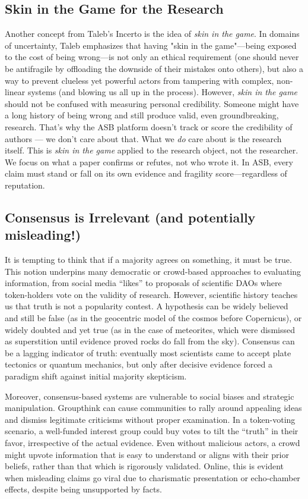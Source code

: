 \documentclass{article}
\begin{document}
\subsection{Skin in the Game for the Research}
Another concept from Taleb's Incerto is the idea of \emph{skin in the game}\cite{Taleb2018}. In domains of uncertainty, Taleb emphasizes that having "skin in the game"—being exposed to the cost of being wrong—is not only an ethical requirement (one should never be antifragile by offloading the downside of their mistakes onto others), but also a way to prevent clueless yet powerful actors from tampering with complex, non-linear systems (and blowing us all up in the process).
However, \emph{skin in the game} should not be confused with measuring personal credibility. Someone might have a long history of being wrong and still produce valid, even groundbreaking, research. That’s why the ASB platform doesn't track or score the credibility of authors — we don't care about that. What we \emph{do} care about is the research itself. 
This is \emph{skin in the game} applied to the research object, not the researcher. We focus on what a paper confirms or refutes, not who wrote it. In ASB, every claim must stand or fall on its own evidence and fragility score—regardless of reputation.

\subsection{Consensus is Irrelevant (and potentially misleading!)}
It is tempting to think that if a majority agrees on something, it must be true. This notion underpins many democratic or crowd-based approaches to evaluating information, from social media ``likes'' to proposals of scientific DAOs where token-holders vote on the validity of research. However, scientific history teaches us that truth is not a popularity contest. A hypothesis can be widely believed and still be false (as in the geocentric model of the cosmos before Copernicus), or widely doubted and yet true (as in the case of meteorites, which were dismissed as superstition until evidence proved rocks do fall from the sky). Consensus can be a lagging indicator of truth: eventually most scientists came to accept plate tectonics or quantum mechanics, but only after decisive evidence forced a paradigm shift against initial majority skepticism.

Moreover, consensus-based systems are vulnerable to social biases and strategic manipulation. Groupthink can cause communities to rally around appealing ideas and dismiss legitimate criticisms without proper examination. In a token-voting scenario, a well-funded interest group could buy votes to tilt the ``truth'' in their favor, irrespective of the actual evidence. Even without malicious actors, a crowd might upvote information that is easy to understand or aligns with their prior beliefs, rather than that which is rigorously validated. Online, this is evident when misleading claims go viral due to charismatic presentation or echo-chamber effects, despite being unsupported by facts.
\end{document}
